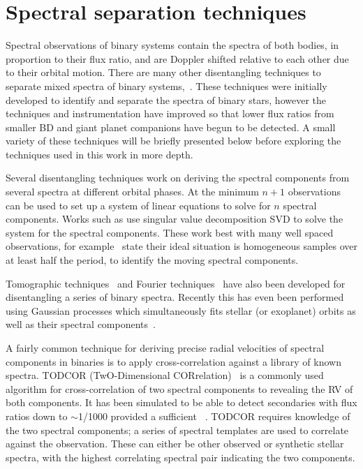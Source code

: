 
\section{Spectral separation techniques}
\label{sec:disentangling_techniques}

Spectral observations of binary systems contain the spectra of both bodies, in proportion to their flux ratio, and are Doppler shifted relative to each other due to their orbital motion.
There are many other disentangling techniques to separate mixed spectra of binary systems,~\citep[e.g.][and references therein]{hadrava_disentangling_2009}.
These techniques were initially developed to identify and separate the spectra of binary stars, however the techniques and instrumentation have improved so that lower flux ratios from smaller BD and giant planet companions have begun to be detected.
A small variety of these techniques will be briefly presented below before exploring the techniques used in this work in more depth.

Several disentangling techniques work on deriving the spectral components from several spectra at different orbital phases.
At the minimum \(n+1\) observations can be used to set up a system of linear equations to solve for \(n\) spectral components.
Works such as \citet[][]{simon_disentangling_1994, sablowski_spectral_2016} use singular value decomposition {SVD} to solve the system for the spectral components.
These work best with many well spaced observations, for example~\citet{sablowski_spectral_2016} state their ideal situation is homogeneous samples over at least half the period, to identify the moving spectral components.

Tomographic techniques~\citep[e.g.][]{bagnuolo_tomographic_1991} and Fourier techniques~\citep{hadrava_orbital_1995} have also been developed for disentangling a series of binary spectra.
Recently this has even been performed using Gaussian processes which simultaneously fits stellar (or exoplanet) orbits as well as their spectral components~\citep{czekala_disentangling_2017}.

A fairly common technique for deriving precise radial velocities of spectral components in binaries is to apply cross-correlation against a library of known spectra.
TODCOR (TwO-Dimensional CORrelation)~\citep{zucker_study_1994} is a commonly used algorithm for cross-correlation of two spectral components to revealing the {RV} of both components.
It has been simulated to be able to detect secondaries with flux ratios down to \(\sim\)1/1000 provided a sufficient \snr{}~\citep[e.g.][]{mazeh_todcor_1994,mazeh_detecting_1997}.
TODCOR requires knowledge of the two spectral components; a series of spectral templates are used to correlate against the observation.
These can either be other observed or synthetic stellar spectra, with the highest correlating spectral pair indicating the two components.

